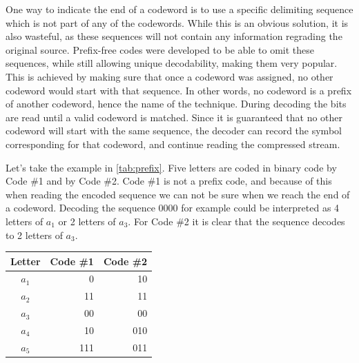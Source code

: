       One way to indicate the end of a codeword is to use a specific delimiting sequence which is not part of any of the codewords. While this is an obvious solution, it is also wasteful, as these sequences will not contain any information regrading the original source. Prefix-free codes were developed to be able to omit these sequences, while still allowing unique decodability, making them very popular. This is achieved by making sure that once a codeword was assigned, no other codeword would start with that sequence. In other words, no codeword is a prefix of another codeword, hence the name of the technique. During decoding the bits are read until a valid codeword is matched. Since it is guaranteed that no other codeword will start with the same sequence, the decoder can record the symbol corresponding for that codeword, and continue reading the compressed stream.
      
      Let's take the example in \autoref{tab:prefix}. Five letters are coded in binary code by Code \#1 and by Code \#2. Code \#1 is not a prefix code, and because of this when reading the encoded sequence we can not be sure when we reach the end of a codeword. Decoding the sequence 0000 for example could be interpreted as 4 letters of $a_1$ or 2 letters of $a_3$. For Code \#2 it is clear that the sequence decodes to 2 letters of $a_3$.
  
      \begin{table}
        \centering
        \begin{tabular}{crr}
          \toprule
          Letter & Code \#1 & Code \#2 \\
          \midrule
          $a_1$ & 0	& 10 \\
          $a_2$ & 11	& 11 \\
          $a_3$ & 00	& 00 \\
          $a_4$ & 10 	& 010 \\
          $a_5$ & 111	& 011 \\
          \bottomrule
        \end{tabular}
        \label{tab:prefix}
      \end{table}
  
